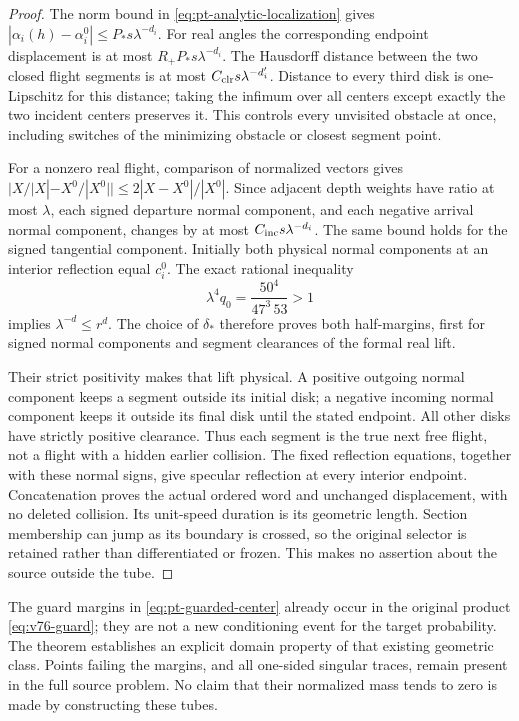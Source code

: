 \begin{proof}
The norm bound in \eqref{eq:pt-analytic-localization} gives
$|\alpha_i(h)-\alpha_i^0|\le P_*s\lambda^{-d_i}$.
For real angles the corresponding endpoint displacement is at most
$R_+P_*s\lambda^{-d_i}$.  The Hausdorff distance between the two
closed flight segments is at most
$C_{\rm clr}s\lambda^{-d'_i}$.
Distance to every third disk is one-Lipschitz for this distance;
taking the infimum over all centers except exactly the two incident
centers preserves it.  This controls every unvisited obstacle at once,
including switches of the minimizing obstacle or closest segment point.

For a nonzero real flight, comparison of normalized vectors gives
$|X/|X|-X^0/|X^0||\le2|X-X^0|/|X^0|$.
Since adjacent depth weights have ratio at most $\lambda$, each
signed departure normal component, and each negative arrival normal
component, changes by at most
$C_{\rm inc}s\lambda^{-d_i}$.  The same bound holds for the
signed tangential component.  Initially both physical normal
components at an interior reflection equal $c_i^0$.
The exact rational inequality
\[
 \lambda^4q_0=\frac{50^4}{47^3\,53}>1
\]
implies $\lambda^{-d}\le r^d$.  The choice of $\delta_*$ therefore
proves both half-margins, first for signed normal components and
segment clearances of the formal real lift.

Their strict positivity makes that lift physical.  A positive outgoing
normal component keeps a segment outside its initial disk; a negative
incoming normal component keeps it outside its final disk until the
stated endpoint.  All other disks have strictly positive clearance.
Thus each segment is the true next free flight, not a flight with a
hidden earlier collision.  The fixed reflection equations, together
with these normal signs, give specular reflection at every interior
endpoint.  Concatenation proves the actual ordered word and unchanged
displacement, with no deleted collision.  Its unit-speed duration is
its geometric length.  Section membership can jump as its boundary is
crossed, so the original selector is retained rather than differentiated
or frozen.  This makes no assertion about the source outside the tube.
\end{proof}

The guard margins in \eqref{eq:pt-guarded-center} already occur in the
original product \eqref{eq:v76-guard}; they are not a new conditioning
event for the target probability.  The theorem establishes an explicit
domain property of that existing geometric class.  Points failing the
margins, and all one-sided singular traces, remain present in the full
source problem.  No claim that their normalized mass tends to zero is
made by constructing these tubes.
